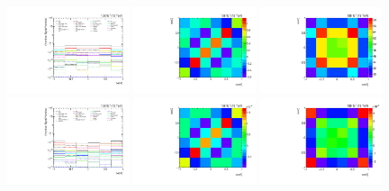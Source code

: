 \begin{figure}[htb]
\begin{center}
 \includegraphics[width=0.32\textwidth]{fig_fullRun2UL/unfolding/combined/deltaSystCombinedlog_rebinnedB_b1n.pdf}
 \includegraphics[width=0.32\textwidth]{fig_fullRun2UL/unfolding/combined/StatCovMatrix_rebinnedB_b1n.pdf}
 \includegraphics[width=0.32\textwidth]{fig_fullRun2UL/unfolding/combined/TotalSystCovMatrix_rebinnedB_b1n.pdf} \\
 \includegraphics[width=0.32\textwidth]{fig_fullRun2UL/unfolding/combined/deltaSystCombinedlogNorm_rebinnedB_b1n.pdf}
 \includegraphics[width=0.32\textwidth]{fig_fullRun2UL/unfolding/combined/StatCovMatrixNorm_rebinnedB_b1n.pdf}
 \includegraphics[width=0.32\textwidth]{fig_fullRun2UL/unfolding/combined/TotalSystCovMatrixNorm_rebinnedB_b1n.pdf} \\

\end{center}
\end{figure}
